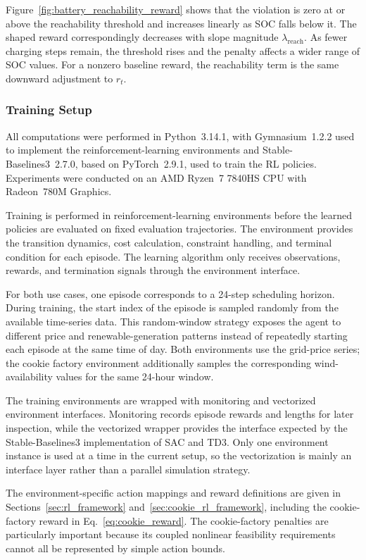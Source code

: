 \documentclass[12pt]{article}
\begin{document}
Figure~\ref{fig:battery_reachability_reward} shows that the violation is zero at or above the reachability threshold and increases linearly as SOC falls below it. The shaped reward correspondingly decreases with slope magnitude $\lambda_{\mathrm{reach}}$. As fewer charging steps remain, the threshold rises and the penalty affects a wider range of SOC values. For a nonzero baseline reward, the reachability term is the same downward adjustment to $r_t$.

\FloatBarrier
\subsubsection{Training Setup}
\label{sec:training_setup}

All computations were performed in Python~3.14.1, with Gymnasium~1.2.2 used to implement the reinforcement-learning environments and Stable-Baselines3~2.7.0, based on PyTorch~2.9.1, used to train the RL policies. Experiments were conducted on an AMD Ryzen~7 7840HS CPU with Radeon~780M Graphics.

Training is performed in reinforcement-learning environments before the learned policies are evaluated on fixed evaluation trajectories. The environment provides the transition dynamics, cost calculation, constraint handling, and terminal condition for each episode. The learning algorithm only receives observations, rewards, and termination signals through the environment interface.

For both use cases, one episode corresponds to a 24-step scheduling horizon. During training, the start index of the episode is sampled randomly from the available time-series data. This random-window strategy exposes the agent to different price and renewable-generation patterns instead of repeatedly starting each episode at the same time of day. Both environments use the grid-price series; the cookie factory environment additionally samples the corresponding wind-availability values for the same 24-hour window.

The training environments are wrapped with monitoring and vectorized environment interfaces. Monitoring records episode rewards and lengths for later inspection, while the vectorized wrapper provides the interface expected by the Stable-Baselines3 implementation of SAC and TD3. Only one environment instance is used at a time in the current setup, so the vectorization is mainly an interface layer rather than a parallel simulation strategy.

The environment-specific action mappings and reward definitions are given in
Sections~\ref{sec:rl_framework} and~\ref{sec:cookie_rl_framework}, including the cookie-factory reward in
Eq.~\eqref{eq:cookie_reward}. The cookie-factory penalties are particularly important because
its coupled nonlinear feasibility requirements cannot all be represented by
simple action bounds.
\end{document}
